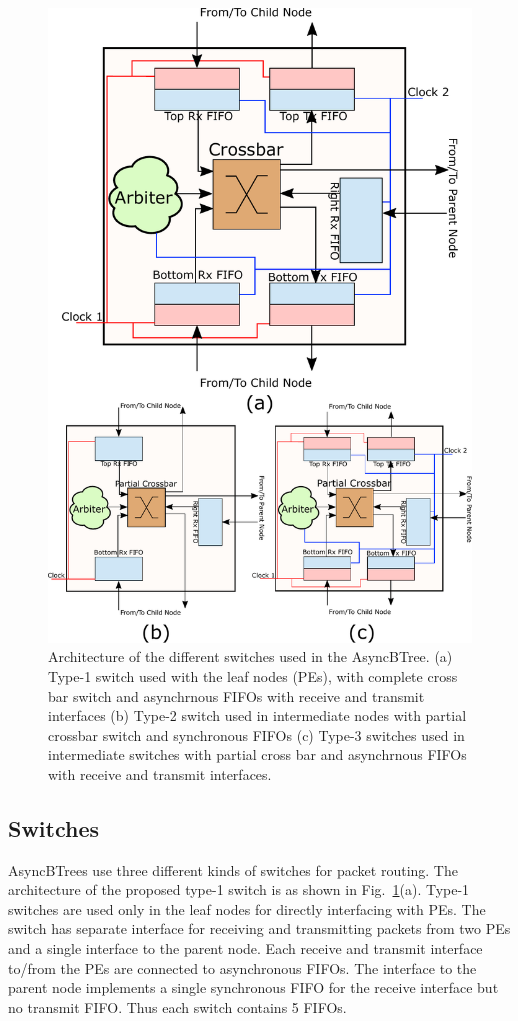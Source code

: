 \begin{figure}[t]
\centering
   \includegraphics[width=\columnwidth]{Figures/switch1_2.pdf}
   \caption{Architecture of the different switches used in the AsyncBTree. (a) Type-1 switch used with the leaf nodes (PEs), with complete cross bar switch and asynchrnous 
   FIFOs with receive and transmit interfaces (b) Type-2 switch used in intermediate nodes with partial crossbar switch and synchronous FIFOs (c) Type-3 switches used in intermediate
   switches with partial cross bar and asynchrnous FIFOs with receive and transmit interfaces.}
   \label{fig:switchArch}
\end{figure}

\subsection{Switches}
\label{sec:switch}
AsyncBTrees use three different kinds of switches for packet routing.
The architecture of the proposed type-1 switch is as shown in Fig.~\ref{fig:switchArch}(a).
Type-1 switches are used only in the leaf nodes for directly interfacing with PEs.
The switch has separate interface for receiving and transmitting packets from two PEs and a single interface to the parent node.
Each receive and transmit interface to/from the PEs are connected to asynchronous FIFOs.
The interface to the parent node implements a single synchronous FIFO for the receive interface but no transmit FIFO.
Thus each switch contains 5 FIFOs.

